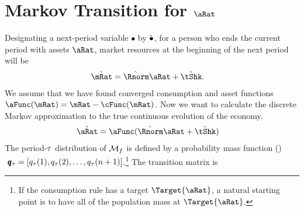 \documentclass[../BufferStockTheory.tex]{subfiles}\usepackage{ApndxSteadyState}
\begin{document}
  \section{Markov Transition for $\aRat$}
  \begin{comment}
    Our derivations will be for consumers who are living in the `true' economy.  In that economy, the transition equation for $\aRat$ is:
    \subsection{Transition for $\aRat$}
    \begin{align}
      \aRat_{\tAbs+1} & = \Rfree (\PGro \pShk_{\tAbs+1})^{-1} \aRat_{\tAbs} + \tShk_{\tAbs+1} - \cFunc_{\tAbs+1}(\Rfree (\PGro \pShk_{\tAbs+1})^{-1}\aRat_{\tAbs}+\tShk_{\tAbs+1})
      \\                \Nxt{_{\tAbs+1}^{\aRat}(\aRat_{\tAbs+1}) & = \CDF_{\tAbs+1}^{\aRat}\left(\Rfree (\PGro \pShk_{\tAbs+1})^{-1} \aRat_{\tAbs} + \tShk_{\tAbs+1} - \cFunc_{\tAbs+1}(\Rfree (\PGro \pShk_{\tAbs+1})^{-1}\aRat_{\tAbs}+\tShk_{\tAbs+1})\right)
    \end{align}
  \end{comment}
  Designating a next-period variable $\bullet$ by $\grave{\bullet}$, for a person who ends the current period with assets $\point$, market resources at the beginning of the next period will be
  \begin{align}
    \Nxt{\mRat} & = \Nxt{\Rnorm}\point+\Nxt{\tShk}.
  \end{align}
  We assume that we have found converged consumption and asset functions $\aFunc(\mRat)=\mRat-\cFunc(\mRat)$.  
Now we want to calculate the discrete Markov approximation to the true continuous evolution of the economy. 
  \begin{align}
    \Nxt{\point} & = \aFunc(\Nxt{\Rnorm} \point + \Nxt{\tShk})
  \end{align}
  The period-$\tau$ distribution of $\mathcal{M}_{f}$ is defined by a probability mass function (\pmf)$~\pmb{q}_{\tau} = [q_{\tau}(1),q_{\tau}(2),\dots,q_{\tau}(n+1)]$.\footnote{If the consumption rule has a target $\Target{\aRat}$, a natural starting point is to have all of the population mass at $\Target{\aRat}$.}  The transition matrix is 
\end{document}
